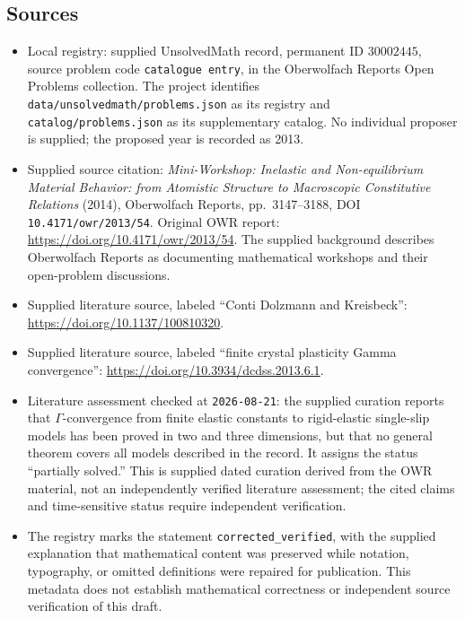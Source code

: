 \documentclass[11pt]{article}
\begin{document}
\subsection{Sources}
\begin{itemize}
\item Local registry: supplied UnsolvedMath record, permanent ID \(30002445\), source problem code \texttt{catalogue entry}, in the Oberwolfach Reports Open Problems collection. The project identifies \texttt{data/unsolvedmath/problems.json} as its registry and \texttt{catalog/problems.json} as its supplementary catalog. No individual proposer is supplied; the proposed year is recorded as 2013.
\item Supplied source citation: \emph{Mini-Workshop: Inelastic and Non-equilibrium Material Behavior: from Atomistic Structure to Macroscopic Constitutive Relations} (2014), Oberwolfach Reports, pp.\ 3147--3188, DOI \texttt{10.4171/owr/2013/54}. Original OWR report: \url{https://doi.org/10.4171/owr/2013/54}. The supplied background describes Oberwolfach Reports as documenting mathematical workshops and their open-problem discussions.
\item Supplied literature source, labeled ``Conti Dolzmann and Kreisbeck'': \url{https://doi.org/10.1137/100810320}.
\item Supplied literature source, labeled ``finite crystal plasticity Gamma convergence'': \url{https://doi.org/10.3934/dcdss.2013.6.1}.
\item Literature assessment checked at \texttt{2026-08-21}: the supplied curation reports that \(\Gamma\)-convergence from finite elastic constants to rigid-elastic single-slip models has been proved in two and three dimensions, but that no general theorem covers all models described in the record. It assigns the status ``partially solved.'' This is supplied dated curation derived from the OWR material, not an independently verified literature assessment; the cited claims and time-sensitive status require independent verification.
\item The registry marks the statement \texttt{corrected\_verified}, with the supplied explanation that mathematical content was preserved while notation, typography, or omitted definitions were repaired for publication. This metadata does not establish mathematical correctness or independent source verification of this draft.
\end{itemize}
\end{document}
